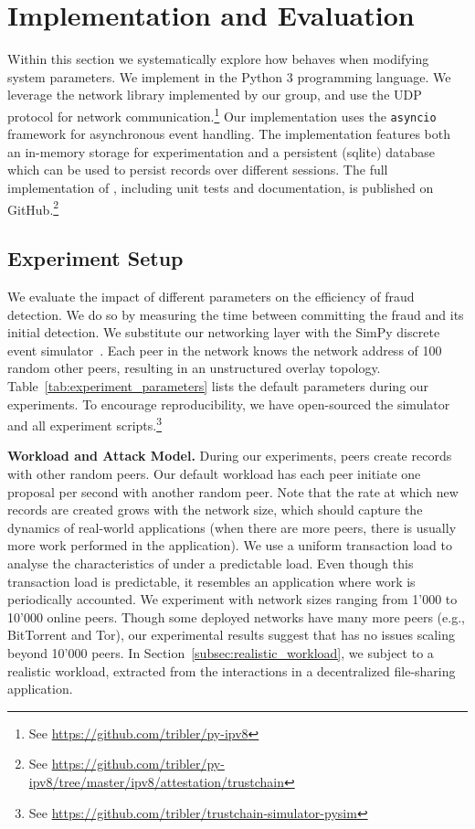 \section{Implementation and Evaluation}
\label{sec:implementation_evaluation}
Within this section we systematically explore how \TrustChain{} behaves when modifying system parameters.
We implement \TrustChain{} in the Python 3 programming language.
We leverage the network library implemented by our group, and use the UDP protocol for network communication.\footnote{See \url{https://github.com/tribler/py-ipv8}}
Our implementation uses the \texttt{asyncio} framework for asynchronous event handling.
The implementation features both an in-memory storage for experimentation and a persistent (sqlite) database which can be used to persist records over different sessions.
The full implementation of \TrustChain{}, including unit tests and documentation, is published on GitHub.\footnote{See \url{https://github.com/tribler/py-ipv8/tree/master/ipv8/attestation/trustchain}}

\subsection{Experiment Setup}
We evaluate the impact of different parameters on the efficiency of fraud detection.
We do so by measuring the time between committing the fraud and its initial detection.
We substitute our networking layer with the SimPy discrete event simulator~\cite{matloff2008introduction}.
Each peer in the \TrustChain{} network knows the network address of 100 random other peers, resulting in an unstructured overlay topology.
Table~\ref{tab:experiment_parameters} lists the default parameters during our experiments.
To encourage reproducibility, we have open-sourced the \TrustChain{} simulator and all experiment scripts.\footnote{See \url{https://github.com/tribler/trustchain-simulator-pysim}}

\textbf{Workload and Attack Model.}
During our experiments, peers create records with other random peers.
Our default workload has each peer initiate one proposal per second with another random peer.
Note that the rate at which new records are created grows with the network size, which should capture the dynamics of real-world applications (when there are more peers, there is usually more work performed in the application).
We use a uniform transaction load to analyse the characteristics of \TrustChain{} under a predictable load.
Even though this transaction load is predictable, it resembles an application where work is periodically accounted.
We experiment with network sizes ranging from 1'000 to 10'000 online peers.
Though some deployed networks have many more peers (e.g., BitTorrent and Tor), our experimental results suggest that \TrustChain{} has no issues scaling beyond 10'000 peers.
In Section~\ref{subsec:realistic_workload}, we subject \TrustChain{} to a realistic workload, extracted from the interactions in a decentralized file-sharing application.

